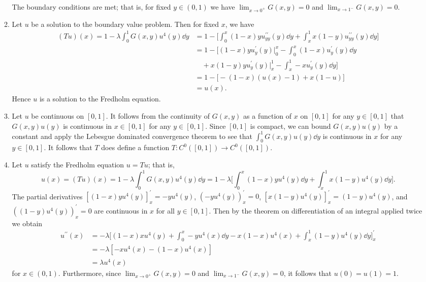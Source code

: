 \documentclass[11pt]{article}
\begin{document}
\begin{enumerate}[label=\textbf{\arabic*.}]
\begin{enumerate}[label=\textsf{(\roman*)}]
        The boundary conditions are met; that is, for fixed $y\in (0,1)$ we have $\lim_{x\to 0^+}G(x,y) = 0$ and $\lim_{x\to 1^-}G(x,y) = 0$.
        \item Let $u$ be a solution to the boundary value problem. Then for fixed $x$, we have \begin{align*}
            (Tu)(x) = 1-\lambda\int_0^1 G(x,y)u^4(y)\dd y &= 1-\bigg[\int_0^x (1-x)y u^{\prime\prime}_{yy}(y) \dd y + \int_x^1 x(1-y) u^{\prime\prime}_{yy}(y) \dd y\bigg]\\
            &= 1-\bigg[(1-x)yu^\prime_y(y)\big|_0^x- \int_0^x (1-x)u^\prime_y(y)\dd y\\
            &\hspace{1em} +x(1-y)yu^\prime_y(y)\big|_x^1 - \int_x^1 -xu^\prime_y(y)\dd y\bigg]\\
            &= 1-\big[-(1-x)(u(x)-1)+x(1-u)\big]\\
            &= u(x).
        \end{align*} Hence $u$ is a solution to the Fredholm equation.
        \item Let $u$ be continuous on $[0,1]$. It follows from the continuity of $G(x,y)$ as a function of $x$ on $[0,1]$ for any $y\in [0,1]$ that $G(x,y)u(y)$ is continuous in $x\in [0,1]$ for any $y\in[0,1]$. Since $[0,1]$ is compact, we can bound $G(x,y)u(y)$ by a constant and apply the Lebesgue dominated convergence theorem to see that $\int_0^1 G(x,y)u(y)\dd y$ is continuous in $x$ for any $y\in [0,1]$. It follows that $T$ does define a function $T\colon C^0([0,1])\to C^0([0,1])$.
        \item Let $u$ satisfy the Fredholm equation $u = Tu$; that is, 
        \[u(x) = (Tu)(x) = 1-\lambda\int_0^1 G(x,y)u^4(y)\dd y = 1-\lambda\bigg[\int_0^x (1-x)y u^{4}(y) \dd y + \int_x^1 x(1-y) u^{4}(y) \dd y\bigg].\]
        The partial derivatives $[(1-x)y u^{4}(y)]^\prime_x = -yu^4(y)$, $(-yu^4(y))^\prime_x = 0$, $[x(1-y) u^{4}(y)]^\prime_x = (1-y)u^4(y)$, and $((1-y)u^4(y))^\prime_x = 0$ are continuous in $x$ for all $y\in [0,1]$. Then by the theorem on differentiation of an integral applied twice we obtain 
        \begin{align*}
            u^{\prime\prime}(x) &= -\lambda\bigg[(1-x)xu^4(y) + \int_0^x -yu^4(x) \dd y - x(1-x)u^4(x) + \int_x^1 (1-y)u^4(y)\dd y\bigg]^\prime_x \\
            &= -\lambda[-xu^4(x) - (1-x)u^4(x)]\\
            &= \lambda u^4(x)
        \end{align*} for $x\in (0,1)$. Furthermore, since $\lim_{x\to 0^+}G(x,y) = 0$ and $\lim_{x\to 1^-}G(x,y) = 0$, it follows that $u(0) = u(1) = 1$.


\end{enumerate}
\end{enumerate}
\end{document}
